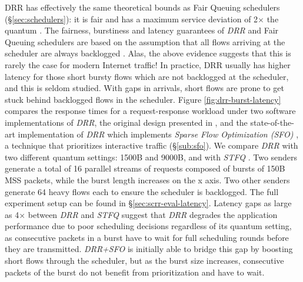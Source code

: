 DRR has effectively the same theoretical bounds as Fair Queuing
schedulers (\S\ref{sec:schedulers}): it is fair and has a maximum
service deviation of 2$\times$ the quantum \cite {drr}. The fairness,
burstiness and latency guarantees of \textit{DRR} and Fair Queuing schedulers
are based on the assumption that all flows arriving at the scheduler
are always backlogged \cite{drr,scfq,stfq}. Alas, the above evidence
suggests that this is rarely the case for modern Internet traffic!
In practice, DRR usually has higher latency for those short bursty
flows which are not backlogged at the scheduler, and this is seldom
studied. With gaps in arrivals, short flows are prone to get stuck
behind backlogged flows in the scheduler.
Figure \ref{fig:drr-burst-latency} compares the response times for
a request-response workload under two software implementations of
\textit{DRR}, the original design presented in \cite{drr}, and the
state-of-the-art implementation of \textit{DRR} which implements \textit{Sparse
Flow Optimization (SFO)} \cite{sfo}, a technique that prioritizes
interactive traffic (\S\ref{sub:sfo}). We compare \textit{DRR} with two
different quantum settings: 1500B and 9000B, and with \textit{STFQ}
\cite{stfq}. Two senders generate a total of 16 parallel streams of requests
composed of bursts of 150B MSS packets, while the burst length increases on the x axis. Two other senders
generate 64 heavy flows each to ensure the scheduler is backlogged. The full
experiment setup can be found in \S\ref{sec:scrr-eval-latency}. Latency
gaps as large as 4$\times$ between \textit{DRR} and \textit{STFQ}
suggest that \textit{DRR} degrades the application performance due to
poor scheduling decisions regardless of its quantum setting, as
consecutive packets in a burst have to wait for full scheduling rounds
before they are transmitted. \textit{DRR+SFO} is initially able to
bridge this gap by boosting short flows through the scheduler, but as
the burst size increases, consecutive packets of the burst do not benefit from prioritization and have to wait.

